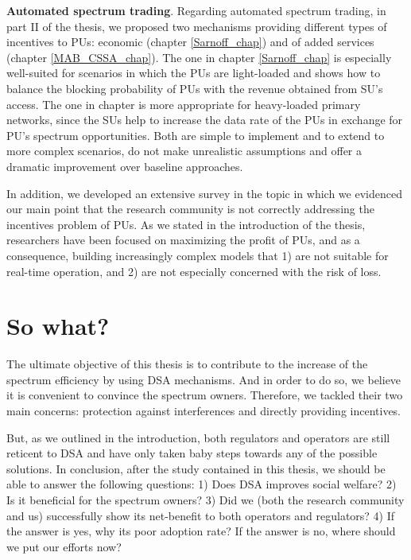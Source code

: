 \textbf{Automated spectrum trading}. Regarding automated spectrum trading, in part II of the thesis, we proposed two mechanisms providing different types of incentives to PUs: economic (chapter \ref{Sarnoff_chap}) and of added services (chapter \ref{MAB_CSSA_chap}). The one in chapter \ref{Sarnoff_chap} is especially well-suited for scenarios in which the PUs are light-loaded and shows how to balance the blocking probability of PUs with the revenue obtained from SU's access. The one in chapter is more appropriate for heavy-loaded primary networks, since the SUs help to increase the data rate of the PUs in exchange for PU's spectrum opportunities. Both are simple to implement and to extend to more complex scenarios, do not make unrealistic assumptions and offer a dramatic improvement over baseline approaches. 

In addition, we developed an extensive survey in the topic in which we evidenced our main point that the research community is not correctly addressing the incentives problem of PUs. As we stated in the introduction of the thesis, researchers have been focused on maximizing the profit of PUs, and as a consequence, building increasingly complex models that 1) are not suitable for real-time operation, and 2) are not especially concerned with the risk of loss.

\section{So what?}
The ultimate objective of this thesis is to contribute to the increase of the spectrum efficiency by using DSA mechanisms. And in order to do so, we believe it is convenient to convince the spectrum owners. Therefore, we tackled their two main concerns: protection against interferences and directly providing incentives. 

But, as we outlined in the introduction, both regulators and operators are still reticent to DSA and have only taken baby steps towards any of the possible solutions. In conclusion, after the study contained in this thesis, we should be able to answer the following questions: 1) Does DSA improves social welfare? 2) Is it beneficial for the spectrum owners? 3) Did we (both the research community and us)  successfully show its net-benefit to both operators and regulators? 4) If the answer is yes, why its poor adoption rate? If the answer is no, where should we put our efforts now?

